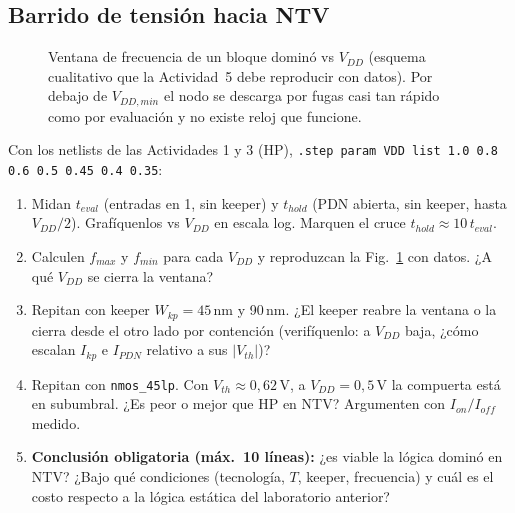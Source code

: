 \documentclass[11pt,a4paper]{article}
\begin{document}
\subsection{Barrido de tensión hacia NTV}

\begin{figure}[htb]
\centering
{}
\caption{Ventana de frecuencia de un bloque dominó vs $V_{DD}$ (esquema cualitativo que la Actividad~5 debe reproducir con datos). Por debajo de $V_{DD,min}$ el nodo se descarga por fugas casi tan rápido como por evaluación y no existe reloj que funcione.}
\label{fig:ntv}
\end{figure}

\begin{tarea}
Con los netlists de las Actividades 1 y 3 (HP), \texttt{.step param VDD list 1.0 0.8 0.6 0.5 0.45 0.4 0.35}:
\begin{enumerate}[nosep,leftmargin=*]
\item Midan $t_{eval}$ (entradas en 1, sin keeper) y $t_{hold}$ (PDN abierta, sin keeper, hasta $V_{DD}/2$). Grafíquenlos vs $V_{DD}$ en escala log. Marquen el cruce $t_{hold}\approx10\,t_{eval}$.
\item Calculen $f_{max}$ y $f_{min}$ para cada $V_{DD}$ y reproduzcan la Fig.~\ref{fig:ntv} con datos. ¿A qué $V_{DD}$ se cierra la ventana?
\item Repitan con keeper $W_{kp}=45$\,nm y 90\,nm. ¿El keeper reabre la ventana o la cierra desde el otro lado por contención (verifíquenlo: a $V_{DD}$ baja, ¿cómo escalan $I_{kp}$ e $I_{PDN}$ relativo a sus $|V_{th}|$)?
\item Repitan con \texttt{nmos\_45lp}. Con $V_{th}\approx0{,}62$\,V, a $V_{DD}=0{,}5$\,V la compuerta está en subumbral. ¿Es peor o mejor que HP en NTV? Argumenten con $I_{on}/I_{off}$ medido.
\item \textbf{Conclusión obligatoria (máx.\ 10 líneas):} ¿es viable la lógica dominó en NTV? ¿Bajo qué condiciones (tecnología, $T$, keeper, frecuencia) y cuál es el costo respecto a la lógica estática del laboratorio anterior?
\end{enumerate}
\end{tarea}
\end{document}

